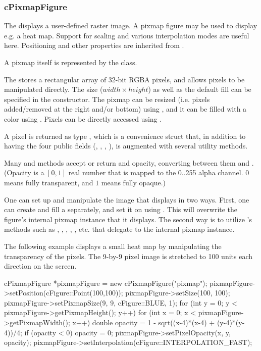 \subsubsection{cPixmapFigure}
\label{sec:graphics:pixmapfigure}

The  displays a user-defined raster image. A pixmap
figure may be used to display e.g. a heat map. Support for scaling and
various interpolation modes are useful here. Positioning and other
properties are inherited from .

A pixmap itself is represented by the  class.

The  stores a rectangular array of 32-bit RGBA pixels,
and allows pixels to be manipulated directly. The size ($width \times
height$) as well as the default fill can be specified in the constructor.
The pixmap can be resized (i.e. pixels added/removed at the right and/or bottom)
using , and it can be filled with a color using .
Pixels can be directly accessed using .

A pixel is returned as type , which is a convenience
struct that, in addition to having the four public  fields
(, , , ), is augmented with several
utility methods.

Many  and  methods accept or return
 and opacity, converting between them and
. (Opacity is a $[0,1]$ real number that is mapped to the
0..255 alpha channel. $0$ means fully transparent, and $1$ means fully
opaque.)

One can set up and manipulate the image that  displays
in two ways. First, one can create and fill a 
separately, and set it on  using .
This will overwrite the figure's internal pixmap instance that it displays.
The second way is to utilize 's methods such as
, , ,
, , etc. that delegate to
the internal pixmap instance.

The following example displays a small heat map by manipulating the
transparency of the pixels. The 9-by-9 pixel image is stretched to
100 units each direction on the screen.

\begin{cpp}
cPixmapFigure *pixmapFigure = new cPixmapFigure("pixmap");
pixmapFigure->setPosition(cFigure::Point(100,100));
pixmapFigure->setSize(100, 100);
pixmapFigure->setPixmapSize(9, 9, cFigure::BLUE, 1);
for (int y = 0; y < pixmapFigure->getPixmapHeight(); y++) {
    for (int x = 0; x < pixmapFigure->getPixmapWidth(); x++) {
        double opacity = 1 - sqrt((x-4)*(x-4) + (y-4)*(y-4))/4;
        if (opacity < 0) opacity = 0;
        pixmapFigure->setPixelOpacity(x, y, opacity);
    }
}
pixmapFigure->setInterpolation(cFigure::INTERPOLATION_FAST);
\end{cpp}

